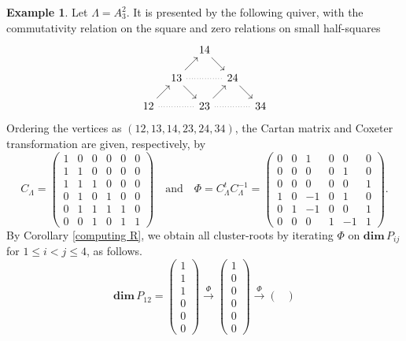 \documentclass[11pt,a4paper]{amsart}
\theoremstyle{definition}
\newtheorem{example}[theorem]{Example}
\numberwithin{equation}{section}
\newcommand{\0}{\mathbf{0}}
\newcommand{\dimv}{\mathbf{dim}\,}
\begin{document}
	\begin{example}\label{exm1}
		Let $\Lambda=A_3^2$. 
		It is presented by the following quiver, with the commutativity
		relation on the square and zero relations on small half-squares
		\[
		\begin{tikzcd}[column sep=.7em,row sep=1.2em]
			&& 14 \arrow[rd] && \\
			& 13 \arrow[ru]
			\arrow[rr,dotted,no head]
			\arrow[rd]
			&& 24 \arrow[rd] & \\
			12 \arrow[rr,dotted,no head]
			\arrow[ru]
			&& 23 \arrow[rr,dotted,no head]
			\arrow[ru]
			&& 34
		\end{tikzcd}
		\] 					
		Ordering the vertices as $(12,13,14,23,24,34)$, the Cartan matrix and Coxeter transformation are given,
	respectively, by
	\[
	C_\Lambda=
	\begin{pmatrix}
		1&0&0&0&0&0\\
		1&1&0&0&0&0\\
		1&1&1&0&0&0\\
		0&1&0&1&0&0\\
		0&1&1&1&1&0\\
		0&0&1&0&1&1
	\end{pmatrix}
	\quad\text{and}\quad
	\Phi=C_\Lambda^tC_\Lambda^{-1}=
	\begin{pmatrix}
		0&0&1&0&0&0\\
		0&0&0&0&1&0\\
		0&0&0&0&0&1\\
		1&0&-1&0&1&0\\
		0&1&-1&0&0&1\\
		0&0&0&1&-1&1
	\end{pmatrix}.
	\] By Corollary \ref{computing R}, we obtain all cluster-roots
	by iterating $\Phi$ on $\dimv P_{ij}$ for $1\le i<j\le4$,
	as follows.
		\[
		\dimv P_{12}=
		\begin{pmatrix}
			1\\1\\1\\0\\0\\0
		\end{pmatrix}
		\xrightarrow{\Phi}
		\begin{pmatrix}
			1\\0\\0\\0\\0\\0
		\end{pmatrix}
		\xrightarrow{\Phi}
		\begin{pmatrix}

\end{pmatrix}\]
\end{example}
\end{document}
